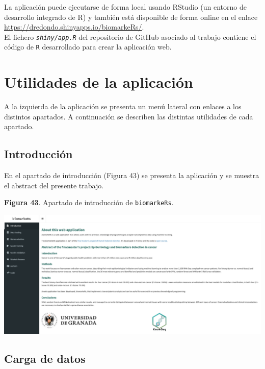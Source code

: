 La aplicación puede ejecutarse de forma local usando RStudio (un entorno de desarrollo integrado de R) \cite{RStudioTeam2020} y también está disponible de forma online en el enlace \url{https://dredondo.shinyapps.io/biomarkeRs/}.\\

El fichero \textit{\texttt{shiny/app.R}} del repositorio de GitHub asociado al trabajo \cite{Redondo-Sanchez2020} contiene el código de \texttt{R} desarrollado para crear la aplicación web.

\section{Utilidades de la aplicación}

A la izquierda de la aplicación se presenta un menú lateral con enlaces a los distintos apartados. A continuación se describen las distintas utilidades de cada apartado.\\

\subsection{Introducción}

En el apartado de introducción (Figura 43) se presenta la aplicación y se muestra el abstract del presente trabajo.

\newpage
\begin{center}
	\textbf{Figura 43}. Apartado de introducción de \texttt{biomarkeRs}.
\end{center}

\begin{center}
	\includegraphics[width=.90\textwidth]{figuras/43_introduction.png} \\
\end{center}

\subsection{Carga de datos}

